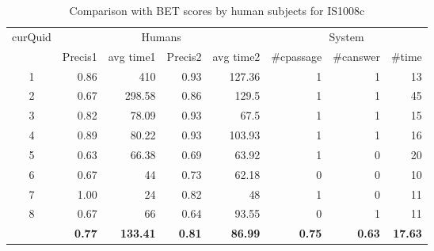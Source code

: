 \begin{table}[ht!]
\scriptsize
\caption{Comparison with BET scores by human subjects for IS1008c}
\begin{tabular}{|c|r|r|r|r|r|r|r|}
\hline
\multicolumn{ 1}{|c|}{curQuid} & \multicolumn{ 4}{c|}{Humans} & \multicolumn{ 3}{c|}{System} \\ \cline{ 2- 8}
\multicolumn{ 1}{|l|}{} & \multicolumn{1}{c|}{Precis1} & \multicolumn{1}{c|}{avg time1} & \multicolumn{1}{c|}{Precis2} & \multicolumn{1}{c|}{avg time2} & \multicolumn{1}{c|}{\#cpassage} & \multicolumn{1}{c|}{\#canswer} & \multicolumn{1}{c|}{\#time} \\ \hline
1 & 0.86 & 410 & 0.93 & 127.36 & 1 & 1 & 13 \\ \hline
2 & 0.67 & 298.58 & 0.86 & 129.5 & 1 & 1 & 45 \\ \hline
3 & 0.82 & 78.09 & 0.93 & 67.5 & 1 & 1 & 15 \\ \hline
4 & 0.89 & 80.22 & 0.93 & 103.93 & 1 & 1 & 16 \\ \hline
5 & 0.63 & 66.38 & 0.69 & 63.92 & 1 & 0 & 20 \\ \hline
6 & 0.67 & 44 & 0.73 & 62.18 & 0 & 0 & 10 \\ \hline
7 & 1.00 & 24 & 0.82 & 48 & 1 & 0 & 11 \\ \hline
8 & 0.67 & 66 & 0.64 & 93.55 & 0 & 1 & 11 \\ \hline
\multicolumn{1}{|l|}{} & \textbf{0.77} & \textbf{133.41} & \textbf{0.81} & \textbf{86.99} & \textbf{0.75} & \textbf{0.63} & \textbf{17.63} \\ \hline
\end{tabular}
\label{table: BET scores for IS1008c}
\end{table}

